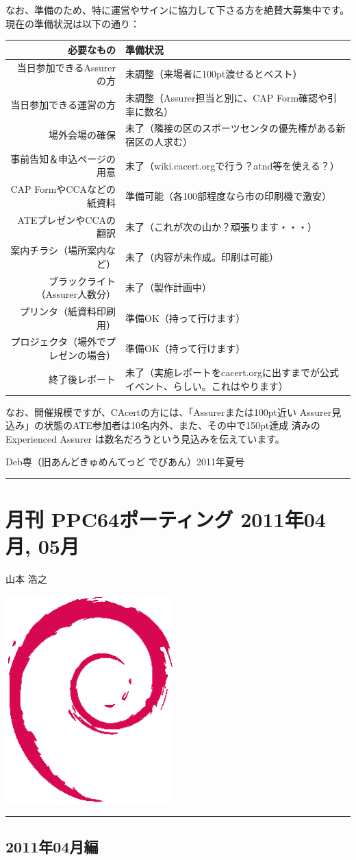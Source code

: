 \documentclass[mingoth,a4paper]{jsarticle}
\renewcommand{\dancersection}[2]{%
\newpage
Deb専（旧あんどきゅめんてっど でびあん）2011年夏号
%
\vspace{0.1mm}\\
{\color{dancerdarkblue}\rule{\hsize}{2mm}}

%
%
\begin{minipage}[t]{0.6\hsize}
\color{dancerdarkblue}
\vspace{1cm}
\section{#1}
\hfill{}#2\\
\end{minipage}
\begin{minipage}[t]{0.4\hsize}
\vspace{-2cm}
\hfill{}\includegraphics[height=8cm]{image200502/openlogo-nd.eps}\\
\vspace{-5cm}
\end{minipage}
%
{\color{dancerlightblue}\rule{0.66\hsize}{2mm}}
%
\vspace{2cm}
}
\begin{document}
なお、準備のため、特に運営やサインに協力して下さる方を絶賛大募集中です。
現在の準備状況は以下の通り：
\begin{table}[H]
\begin{center}
\begin{tabular}{|r|p{30em}|}
\hline
必要なもの & 準備状況
\\ \hline
当日参加できるAssurerの方 & 未調整（来場者に100pt渡せるとベスト）
\\ \hline
当日参加できる運営の方 & 未調整（Assurer担当と別に、CAP Form確認や引率に数名）
\\ \hline
場外会場の確保 & 未了（隣接の区のスポーツセンタの優先権がある新宿区の人求む）
\\ \hline
事前告知＆申込ページの用意 & 未了（wiki.cacert.orgで行う？atnd等を使える？）
\\ \hline
CAP FormやCCAなどの紙資料 & 準備可能（各100部程度なら市の印刷機で激安）
\\ \hline
ATEプレゼンやCCAの翻訳 & 未了（これが次の山か？頑張ります・・・）
\\ \hline
案内チラシ（場所案内など） & 未了（内容が未作成。印刷は可能）
\\ \hline
ブラックライト（Assurer人数分）& 未了（製作計画中）
\\ \hline
プリンタ（紙資料印刷用） & 準備OK（持って行けます）
\\ \hline
プロジェクタ（場外でプレゼンの場合） & 準備OK（持って行けます）
\\ \hline
終了後レポート & 未了（実施レポートをcacert.orgに出すまでが公式イベント、らしい。これはやります）
\\ \hline
\end{tabular}
\end{center}
\end{table}

なお、開催規模ですが、CAcertの方には、「Assurerまたは100pt近い
Assurer見込み」の状態のATE参加者は10名内外、また、その中で150pt達成
済みの Experienced Assurer は数名だろうという見込みを伝えています。

\dancersection{月刊 PPC64ポーティング 2011年04月, 05月}{山本 浩之}

\subsection{2011年04月編}
\end{document}
